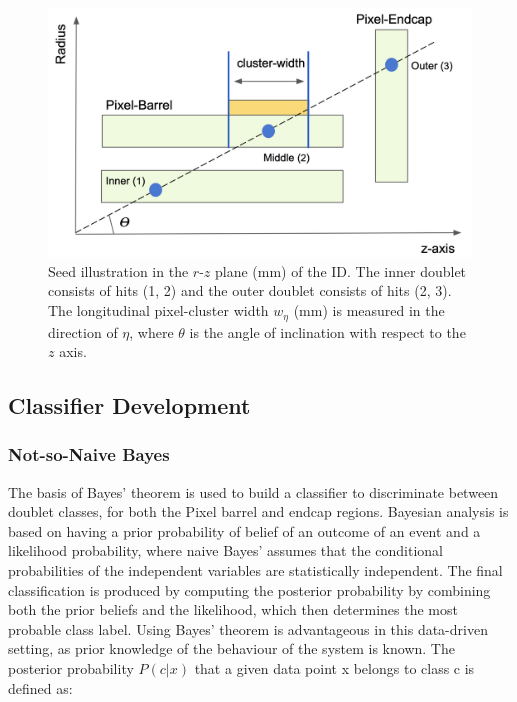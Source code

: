 \begin{figure}[!htbp]
\centering
    \includegraphics[width=0.83\linewidth]{images/4-ml-based-predictor/triplet_illustation.png}
    \caption{Seed illustration in the $r$-$z$ plane (mm) of the ID. The inner doublet consists of hits (1, 2) and the outer doublet consists of hits (2, 3). The longitudinal pixel-cluster width $w_{\eta}$ (mm) is measured in the direction of $\eta$, where $\theta$ is the angle of inclination with respect to the $z$ axis.}
\label{fig:triplet-illustration}
\end{figure}


\subsection{Classifier Development}
\label{section:classifier-dev}

\subsubsection{Not-so-Naive Bayes}

The basis of Bayes’ theorem \cite{naive-bayes} is used to build a classifier to discriminate between doublet classes, for both the Pixel barrel and endcap regions. Bayesian analysis is based on having a prior probability of belief of an outcome of an event and a likelihood probability, where naive Bayes’ assumes that the conditional probabilities of the independent variables are statistically independent. The final classification is produced by computing the posterior probability by combining both the prior beliefs and the likelihood, which then determines the most probable class label. Using Bayes’ theorem is advantageous in this data-driven setting, as prior knowledge of the behaviour of the system is known. The posterior probability $P(c|x)$ that a given data point x belongs to class c is defined as:

